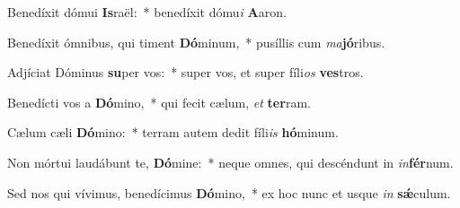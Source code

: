 \item Benedíxit dómui \textbf{Is}raël:~* benedíxit dómu\textit{i} \textbf{A}aron.
\item Benedíxit ómnibus, qui timent \textbf{Dó}minum,~* pusíllis cum \textit{ma}\textbf{jó}ribus.
\item Adjíciat Dóminus \textbf{su}per vos:~* super vos, et super fíli\textit{os} \textbf{ves}tros.
\item Benedícti vos a \textbf{Dó}mino,~* qui fecit cælum, \textit{et} \textbf{ter}ram.
\item Cælum cæli \textbf{Dó}mino:~* terram autem dedit fíli\textit{is} \textbf{hó}minum.
\item Non mórtui laudábunt te, \textbf{Dó}mine:~* neque omnes, qui descéndunt in \textit{in}\textbf{fér}num.
\item Sed nos qui vívimus, benedícimus \textbf{Dó}mino,~* ex hoc nunc et usque \textit{in} \textbf{sǽ}culum.
